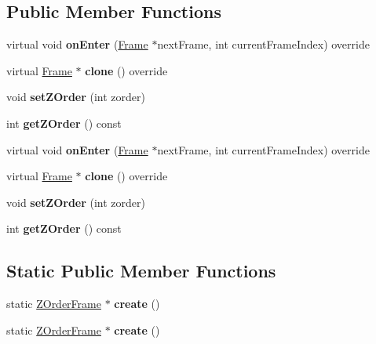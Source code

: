 \subsection*{Public Member Functions}
\begin{DoxyCompactItemize}
\item 
\mbox{\label{classZOrderFrame_a2d5c27460902cd3e87b21ee799a4a78d}} 
virtual void {\bfseries on\+Enter} (\hyperlink{classFrame}{Frame} $\ast$next\+Frame, int current\+Frame\+Index) override
\item 
\mbox{\label{classZOrderFrame_a3993de327d0e9780d44b13bb191b4380}} 
virtual \hyperlink{classFrame}{Frame} $\ast$ {\bfseries clone} () override
\item 
\mbox{\label{classZOrderFrame_aaaea580899ddda70ebc5c6556aa938cc}} 
void {\bfseries set\+Z\+Order} (int zorder)
\item 
\mbox{\label{classZOrderFrame_a0e0f0d9cc7f7704b3bf74257756ef3c8}} 
int {\bfseries get\+Z\+Order} () const
\item 
\mbox{\label{classZOrderFrame_a079d45c988aab202912af8ae124f7f23}} 
virtual void {\bfseries on\+Enter} (\hyperlink{classFrame}{Frame} $\ast$next\+Frame, int current\+Frame\+Index) override
\item 
\mbox{\label{classZOrderFrame_a99032b2d0dc8a42f748ac795dd404110}} 
virtual \hyperlink{classFrame}{Frame} $\ast$ {\bfseries clone} () override
\item 
\mbox{\label{classZOrderFrame_aaaea580899ddda70ebc5c6556aa938cc}} 
void {\bfseries set\+Z\+Order} (int zorder)
\item 
\mbox{\label{classZOrderFrame_a0e0f0d9cc7f7704b3bf74257756ef3c8}} 
int {\bfseries get\+Z\+Order} () const
\end{DoxyCompactItemize}
\subsection*{Static Public Member Functions}
\begin{DoxyCompactItemize}
\item 
\mbox{\label{classZOrderFrame_af45e612dfb72bc9c78907bc8df0a79af}} 
static \hyperlink{classZOrderFrame}{Z\+Order\+Frame} $\ast$ {\bfseries create} ()
\item 
\mbox{\label{classZOrderFrame_ae9af10de01992c32580143c4a076867d}} 
static \hyperlink{classZOrderFrame}{Z\+Order\+Frame} $\ast$ {\bfseries create} ()
\end{DoxyCompactItemize}
